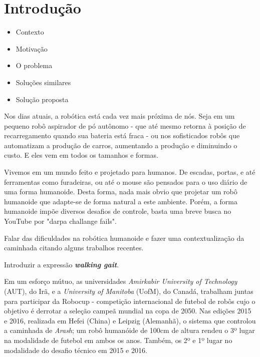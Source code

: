 \chapter{Introdução}

\begin{guide}
	\begin{itemize}
		\item Contexto
		\item Motivação
		\item O problema
		\item Soluções similares
		\item Solução proposta
	\end{itemize}
\end{guide}

\begin{draft}
Nos dias atuais, a robótica está cada vez mais próxima de nós. Seja em um pequeno robô aspirador de pó autônomo - que até mesmo retorna à posição de recarregamento quando sua bateria está fraca - ou nos sofisticados robôs que automatizam a produção de carros, aumentando a produção e diminuindo o custo. E eles vem em todos os tamanhos e formas.
\end{draft}

Vivemos em um mundo feito e projetado para humanos. De escadas, portas, e até ferramentas como furadeiras, ou até o mouse são pensados para o uso diário de uma forma humanoide. Desta forma, nada mais obvio que projetar um robô humanoide que adapte-se de forma natural a este ambiente. Porém, a forma humanoide impõe diversos desafios de controle, basta uma breve busca no YouTube por "darpa challange fails".

\begin{guide}
	Falar das dificuldades na robótica humanoide e fazer uma contextualização
	da caminhada citando alguns trabalhos recentes.
\end{guide}

\begin{TODO}
	Introduzir a expressão \textbf{\textit{walking gait}}.
\end{TODO}

Em um esforço mútuo, as universidades \textit{Amirkabir University of Technology} (AUT), do Irã, e a \textit{University of Manitoba} (UofM), do Canadá, trabalham juntas para participar da Robocup - competição internacional de futebol de robôs cujo o objetivo é derrotar a seleção campeã mundial na copa de 2050. Nas edições 2015 e 2016, realizada em Hefei (China) e Leipzig (Alemanhã), o sistema que controlou a caminhada de \textit{Arash}; um robô humanóide de 100cm de altura rendeu o 3º lugar na modalidade de futebol em ambos os anos. Também, os 2º e 1º lugar no modalidade do desafio técnico em 2015 e 2016.

